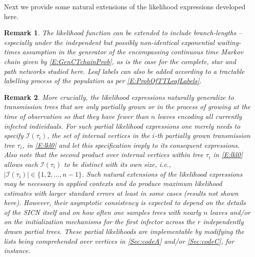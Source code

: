 \documentclass[review]{elsarticle}
\numberwithin{equation}{section}
\let\orgautoref\autoref
\renewcommand{\autoref}
        {\def\equationautorefname{Eq.}%
         \def\figureautorefname{Fig.}%
         \def\subfigureautorefname{Fig.}%
         \def\sectionautorefname{Sect.}%
         \def\subsectionautorefname{Sect.}%
         \def\subsubsectionautorefname{Sect.}%
         \def\Itemautorefname{item}%
         \def\tableautorefname{Table}%
         \def\propositionautorefname{Prop.}%
         \def\corollaryautorefname{Corollary}%
         \def\theoremautorefname{Theorem}%
         \def\remarkautorefname{Remark}%
         \def\lemmaautorefname{Lemma}%
         \def\proofofautorefname{Proof}%
         \def\exampleautorefname{Example}%
         \orgautoref}
\providecommand{\autorefs}
        {\def\equationautorefname{Eqs.}%
         \def\figureautorefname{Figs.}%
         \def\subfigureautorefname{Figs.}%
         \def\sectionautorefname{Sects.}%
         \def\subsectionautorefname{Sects.}%
         \def\subsubsectionautorefname{Sects.}%
         \def\Itemautorefname{items}%
         \def\tableautorefname{Tables}%
         \def\propositionautorefname{Props.}%
         \def\theoremautorefname{Theorems}%
         \def\theoremautorefname{Remarks}%
         \def\lemmaautorefname{Lemmas}%
         \def\proofofautorefname{Proofs}%
         \def\exampleautorefname{Examples}%
         \orgautoref}
\newtheorem{remark}{Remark}%
\begin{document}
Next we provide some natural extensions of the likelihood expressions developed here.
\begin{remark}\label{R:ElaborateLklFuncs1}
The likelihood function can be extended to include branch-lengths -- especially under the independent but possibly non-identical exponential waiting-times assumption in the generator of the encompassing continuous time Markov chain given by \autoref{E:GenCTchainProb}, as is the case for the complete, star and path networks studied here.  
Leaf labels can also be added according to a tractable labelling process of the population as per \autoref{E:ProbOfTTLeafLabels}.
\end{remark}

\begin{remark}\label{R:ElaborateLklFuncs2}
More crucially, the likelihood expressions naturally generalize to transmission trees that are only partially grown or in the process of growing at the time of observation so that they have fewer than $n$ leaves encoding all currently infected individuals.  
For such {\em partial likelihood} expressions one merely needs to specify $\mathcal{I}(\tau_i)$, the set of internal vertices in the $i$-th partially grown transmission tree $\tau_i$, in \autoref{E:lkl0} and let this specification imply to its consequent expressions. 
Also note that the second product over internal vertices within tree $\tau_i$ in \autoref{E:lkl0} allows each $\mathcal{I}(\tau_i)$ to be distinct with its own size, i.e., $|\mathcal{I}(\tau_i)| \in \{1,2,\ldots,n-1\}$. 
Such natural extensions of the likelihood expressions may be necessary in applied contexts and do produce maximum likelihood estimates with larger standard errors at least in some cases (results not shown here).  
However, their asymptotic consistency is expected to depend on the details of the SICN itself and on how often one samples trees with nearly $n$ leaves and/or on the initialization mechanisms for the first infector across the $r$ independently drawn partial trees.  
These partial likelihoods are implementable by modifying the lists being comprehended over vertices in \autoref{Sec:codeA} and/or \autoref{Sec:codeC}, for instance.  
\end{remark}
\end{document}
